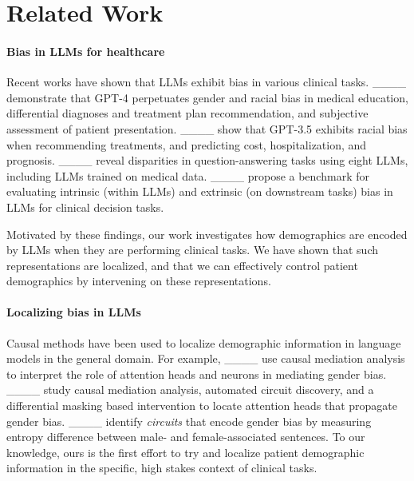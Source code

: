 \section{Related Work}
\label{section:related-work}

\paragraph{Bias in LLMs for healthcare}
Recent works have shown that LLMs exhibit bias in various clinical tasks. 
____ demonstrate that GPT-4 perpetuates gender and racial bias in medical education, differential diagnoses and treatment plan recommendation, and subjective assessment of patient presentation. 
____ show that GPT-3.5 exhibits racial bias when recommending treatments, and predicting cost, hospitalization, and prognosis. ____ reveal disparities in question-answering tasks using eight LLMs, including LLMs trained on medical data. 
____ propose a benchmark for evaluating intrinsic (within LLMs) and extrinsic (on downstream tasks) bias in LLMs for clinical decision tasks. 

Motivated by these findings, our work investigates how demographics are encoded by LLMs when they are performing clinical tasks. 
We have shown that such representations are localized, and that we can effectively control patient demographics by intervening on these representations. 

\paragraph{Localizing bias in LLMs}Causal methods have been used to localize demographic information in language models in the general domain. 
For example, ____ use causal mediation analysis to interpret the role of attention heads and neurons in mediating gender bias. 
____ study causal mediation analysis,
automated circuit discovery, and a differential
masking based intervention to locate attention heads that propagate gender bias. ____ identify \emph{circuits} that encode gender bias by measuring entropy difference between  male- and female-associated sentences. 
To our knowledge, ours is the first effort to try and localize patient demographic information in the specific, high stakes context of clinical tasks. 
